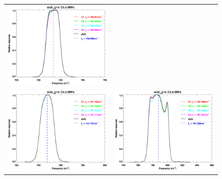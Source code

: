 \begin{figure}[htp]
\begin{tabular}{c c}
    \includegraphics[scale=0.5]{graphics/nominal/sndr_g14.ch4.srf.eps} \\
    \includegraphics[scale=0.5]{graphics/nominal/sndr_g14.ch5.srf.eps} &
    \includegraphics[scale=0.5]{graphics/nominal/sndr_g14.ch6.srf.eps}

\end{tabular}
\end{figure}
